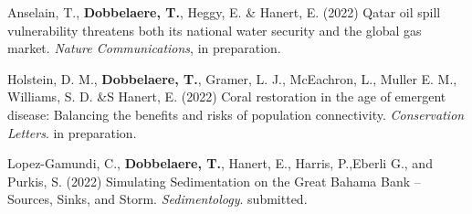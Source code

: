 \begin{list}{}{%
    \setlength{\topsep}{0pt}%
    \setlength{\leftmargin}{0.23in}%
    \setlength{\listparindent}{-0.23in}%
    \setlength{\itemindent}{-0.23in}%
    \setlength{\parsep}{\parskip}%
    }
    \item Anselain, T., \textbf{Dobbelaere, T.}, Heggy, E. \& Hanert, E. (2022) Qatar oil spill vulnerability threatens both its national water security and the global gas market. \textit{Nature Communications}, in preparation.
    
    \item Holstein, D. M., \textbf{Dobbelaere, T.}, Gramer, L. J., McEachron, L., Muller E. M., Williams, S. D. \&S Hanert, E. (2022) Coral restoration in the age of emergent disease: Balancing the benefits and risks of population connectivity. \textit{Conservation Letters}. in preparation. 
    
    \item Lopez-Gamundi, C., \textbf{Dobbelaere, T.}, Hanert, E., Harris, P.,Eberli G., and Purkis, S. (2022) Simulating Sedimentation on the Great Bahama Bank – Sources, Sinks, and Storm. \textit{Sedimentology}. submitted.
    
\end{list}